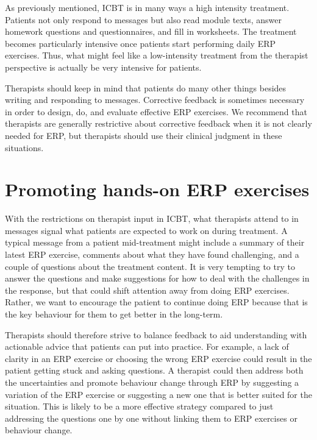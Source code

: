\documentclass[]{book}
\theoremstyle{definition}
\theoremstyle{definition}
\theoremstyle{definition}
\theoremstyle{remark}
\begin{document}
As previously mentioned, ICBT is in many ways a high intensity
treatment. Patients not only respond to messages but also read module
texts, answer homework questions and questionnaires, and fill in
worksheets. The treatment becomes particularly intensive once patients
start performing daily ERP exercises. Thus, what might feel like a
low-intensity treatment from the therapist perspective is actually be
very intensive for patients.

Therapists should keep in mind that patients do many other things
besides writing and responding to messages. Corrective feedback is
sometimes necessary in order to design, do, and evaluate effective ERP
exercises. We recommend that therapists are generally restrictive about
corrective feedback when it is not clearly needed for ERP, but
therapists should use their clinical judgment in these situations.

\hypertarget{promoting-hands-on-erp-exercises}{%
\section{Promoting hands-on ERP
exercises}\label{promoting-hands-on-erp-exercises}}

With the restrictions on therapist input in ICBT, what therapists attend
to in messages signal what patients are expected to work on during
treatment. A typical message from a patient mid-treatment might include
a summary of their latest ERP exercise, comments about what they have
found challenging, and a couple of questions about the treatment
content. It is very tempting to try to answer the questions and make
suggestions for how to deal with the challenges in the response, but
that could shift attention away from doing ERP exercises. Rather, we
want to encourage the patient to continue doing ERP because that is the
key behaviour for them to get better in the long-term.

Therapists should therefore strive to balance feedback to aid
understanding with actionable advice that patients can put into
practice. For example, a lack of clarity in an ERP exercise or choosing
the wrong ERP exercise could result in the patient getting stuck and
asking questions. A therapist could then address both the uncertainties
and promote behaviour change through ERP by suggesting a variation of
the ERP exercise or suggesting a new one that is better suited for the
situation. This is likely to be a more effective strategy compared to
just addressing the questions one by one without linking them to ERP
exercises or behaviour change.
\end{document}

